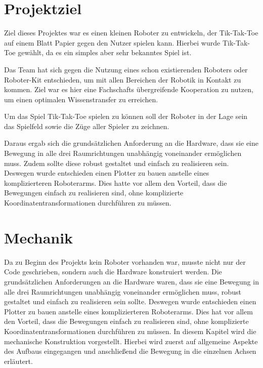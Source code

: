 \documentclass[conference,compsoc,final,a4paper]{IEEEtran}
\begin{document}
{\small\tableofcontents}

\section{Projektziel}

Ziel dieses Projektes war es einen kleinen Roboter zu entwickeln, der Tik-Tak-Toe
auf einem Blatt Papier gegen den Nutzer spielen kann. Hierbei wurde Tik-Tak-Toe
gewählt, da es ein simples aber sehr bekanntes Spiel ist.

Das Team hat sich gegen die Nutzung eines schon existierenden Roboters oder Roboter-Kit
entschieden, um mit allen Bereichen der Robotik in Kontakt zu kommen. Ziel war es hier
eine Fachschafts übergreifende Kooperation zu nutzen, um einen optimalen Wissenstransfer
zu erreichen.

Um das Spiel Tik-Tak-Toe spielen zu können soll der Roboter in der Lage sein das Spielfeld
sowie die Züge aller Spieler zu zeichnen. 

Daraus ergab sich die grundsätzlichen Anforderung
an die Hardware, dass sie eine Bewegung in alle drei Raumrichtungen unabhängig voneinander
ermöglichen muss. Zudem sollte diese robust gestaltet und einfach zu realisieren sein.
Deswegen wurde entschieden einen Plotter zu bauen anstelle eines komplizierteren
Roboterarms. Dies hatte vor allem den Vorteil, dass die Bewegungen einfach zu realisieren
sind, ohne komplizierte Koordinatentransformationen durchführen zu müssen.


\section{Mechanik}

Da zu Beginn des Projekts kein Roboter vorhanden war, musste nicht nur der Code geschrieben, sondern auch die Hardware
konstruiert werden. Die grundsätzlichen Anforderungen an die Hardware waren, dass sie eine Bewegung in alle drei Raumrichtungen
unabhängig voneinander ermöglichen muss, robust gestaltet und einfach zu realisieren sein sollte. Deswegen wurde entschieden einen
Plotter zu bauen anstelle eines komplizierteren Roboterarms. Dies hat vor allem den Vorteil, dass die Bewegungen einfach zu
realisieren sind, ohne komplizierte Koordinatentransformationen durchführen zu müssen. In diesem Kapitel wird die mechanische Konstruktion
vorgestellt. Hierbei wird zuerst auf allgemeine Aspekte des Aufbaus eingegangen und anschließend die Bewegung in die einzelnen Achsen erläutert.
\end{document}
